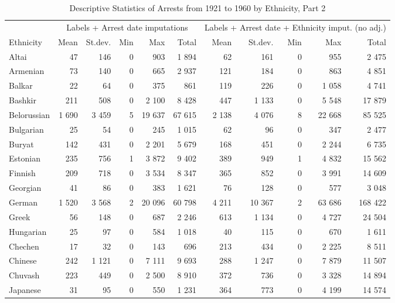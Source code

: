 \begin{table}[!h]

\caption{\label{tab:descr_stats_date_imp}Descriptive Statistics of Arrests from 1921 to 1960 by Ethnicity, Part 2}
\centering
\fontsize{8}{10}\selectfont
\begin{tabular}{lrrrrrrrrrr}
\toprule
\multicolumn{1}{c}{ } & \multicolumn{5}{c}{Labels + Arrest date imputations} & \multicolumn{5}{c}{Labels + Arrest date + Ethnicity imput. (no adj.)} \\
\cmidrule(l{2pt}r{2pt}){2-6} \cmidrule(l{2pt}r{2pt}){7-11}
Ethnicity & Mean & St.dev. & Min & Max & Total & Mean & St.dev. & Min & Max & Total\\
\midrule
Altai & 47 & 146 & 0 & 903 & 1 894 & 62 & 161 & 0 & 955 & 2 475\\
Armenian & 73 & 140 & 0 & 665 & 2 937 & 121 & 184 & 0 & 863 & 4 851\\
Balkar & 22 & 64 & 0 & 375 & 861 & 119 & 226 & 0 & 1 058 & 4 741\\
Bashkir & 211 & 508 & 0 & 2 100 & 8 428 & 447 & 1 133 & 0 & 5 548 & 17 879\\
Belorussian & 1 690 & 3 459 & 5 & 19 637 & 67 615 & 2 138 & 4 076 & 8 & 22 668 & 85 525\\
Bulgarian & 25 & 54 & 0 & 245 & 1 015 & 62 & 96 & 0 & 347 & 2 477\\
Buryat & 142 & 431 & 0 & 2 201 & 5 679 & 168 & 451 & 0 & 2 244 & 6 735\\
Estonian & 235 & 756 & 1 & 3 872 & 9 402 & 389 & 949 & 1 & 4 832 & 15 562\\
Finnish & 209 & 718 & 0 & 3 534 & 8 347 & 365 & 852 & 0 & 3 991 & 14 609\\
Georgian & 41 & 86 & 0 & 383 & 1 621 & 76 & 128 & 0 & 577 & 3 048\\
German & 1 520 & 3 568 & 2 & 20 096 & 60 798 & 4 211 & 10 367 & 2 & 63 686 & 168 422\\
Greek & 56 & 148 & 0 & 687 & 2 246 & 613 & 1 134 & 0 & 4 727 & 24 504\\
Hungarian & 25 & 97 & 0 & 584 & 1 018 & 40 & 115 & 0 & 670 & 1 611\\
Chechen & 17 & 32 & 0 & 143 & 696 & 213 & 434 & 0 & 2 225 & 8 511\\
Chinese & 242 & 1 121 & 0 & 7 111 & 9 693 & 288 & 1 247 & 0 & 7 879 & 11 507\\
Chuvash & 223 & 449 & 0 & 2 500 & 8 910 & 372 & 736 & 0 & 3 328 & 14 894\\
Japanese & 31 & 95 & 0 & 550 & 1 231 & 364 & 773 & 0 & 4 199 & 14 574\\

\end{tabular}
\end{table}
